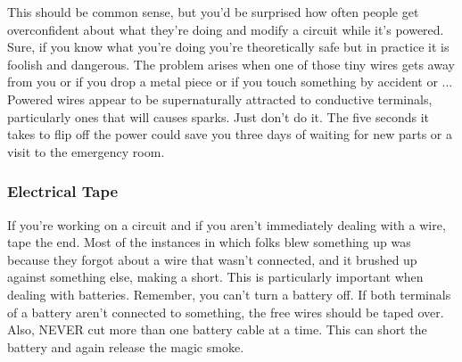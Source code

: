 This should be common sense, but you'd be surprised how often people get
overconfident about what they're doing and modify a circuit while it's
powered. Sure, if you know what you're doing you're theoretically safe
but in practice it is foolish and dangerous. The problem arises when one
of those tiny wires gets away from you or if you drop a metal piece or
if you touch something by accident or ... Powered wires appear to be
supernaturally attracted to conductive terminals, particularly ones that
will causes sparks. Just don't do it. The five seconds it takes to flip
off the power could save you three days of waiting for new parts or a
visit to the emergency room.

\hypertarget{electrical-tape}{%
\subsubsection{Electrical Tape}\label{electrical-tape}}

If you're working on a circuit and if you aren't immediately dealing
with a wire, tape the end. Most of the instances in which folks blew
something up was because they forgot about a wire that wasn't connected,
and it brushed up against something else, making a short. This is
particularly important when dealing with batteries. Remember, you can't
turn a battery off. If both terminals of a battery aren't connected to
something, the free wires should be taped over. Also, NEVER cut more
than one battery cable at a time. This can short the battery and again
release the magic smoke.
